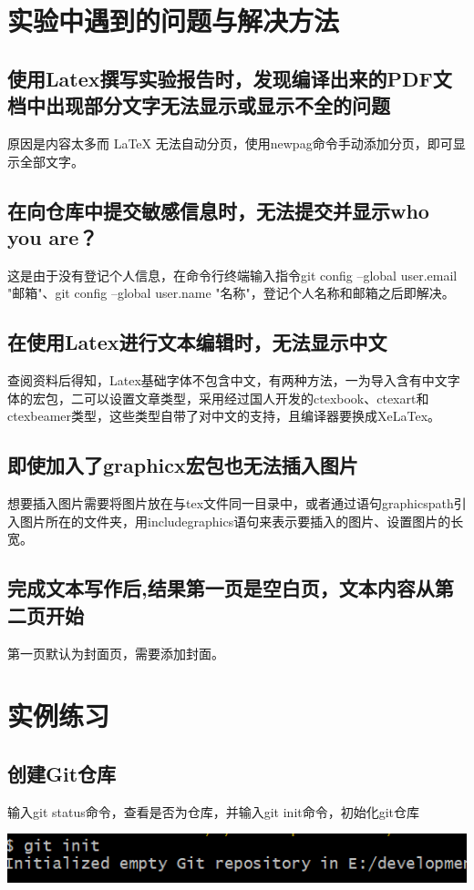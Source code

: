 \documentclass[UTF8,a4paper]{ctexart}
\begin{document}
\begin{sloppypar}
	\newpage

	\section{实验中遇到的问题与解决方法}
	\subsection{使用Latex撰写实验报告时，发现编译出来的PDF文档中出现部分文字无法显示或显示不全的问题}
	原因是内容太多而 LaTeX 无法自动分页，使用newpag命令手动添加分页，即可显示全部文字。
	\subsection{在向仓库中提交敏感信息时，无法提交并显示who you are？}
	这是由于没有登记个人信息，在命令行终端输入指令git config --global user.email "邮箱"、git config --global user.name "名称"，登记个人名称和邮箱之后即解决。
	\subsection{在使用Latex进行文本编辑时，无法显示中文}
	查阅资料后得知，Latex基础字体不包含中文，有两种方法，一为导入含有中文字体的宏包，二可以设置文章类型，采用经过国人开发的ctexbook、ctexart和ctexbeamer类型，这些类型自带了对中文的支持，且编译器要换成XeLaTex。
	\subsection{即使加入了graphicx宏包也无法插入图片}
	想要插入图片需要将图片放在与tex文件同一目录中，或者通过语句graphicspath引入图片所在的文件夹，用includegraphics语句来表示要插入的图片、设置图片的长宽。
	\subsection{完成文本写作后,结果第一页是空白页，文本内容从第二页开始}
	第一页默认为封面页，需要添加封面。
	
	\graphicspath{{picture/}}
	\section{实例练习}
	\subsection{创建Git仓库}
	输入git status命令，查看是否为仓库，并输入git init命令，初始化git仓库
	
	\includegraphics[width = 16cm]{1}
	

\end{sloppypar}
\end{document}
